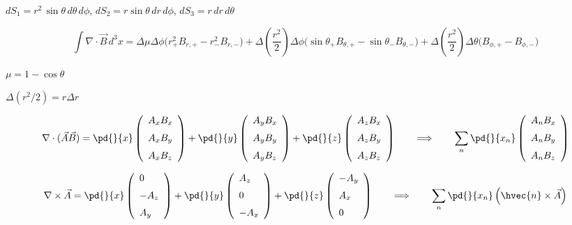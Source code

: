 \documentclass{article}
\begin{document}
$ dS_1 = r^2\,\sin\theta\,d\theta\,d\phi,
\, dS_2 = r\sin\theta\, dr\,d\phi,\, dS_3 = r\,dr\,d\theta$
\pagebreak

\[     \int \nabla\cdot\vec{B}\, d^3x
   =  \Delta \mu\Delta\phi
        \Big(r^2_+B_{r,+} - r^2_-B_{r,-}\Big)
    + \Delta\left(\frac{r^2}{2}\right) \Delta\phi
        \Big(  \sin\theta_+B_{\theta,+} - \sin\theta_-B_{\theta,-}\Big)
    + \Delta\left(\frac{r^2}{2}\right)\Delta\theta
        \Big(B_{\phi,+} - B_{\phi,-}\Big)
\]
\pagebreak

$\mu = 1-\cos\theta$
\pagebreak

$\Delta (r^2/2) = r\Delta r$
\pagebreak

\[     \nabla\cdot(\vec{A}\vec{B}) =
     \pd{}{x}\left(\begin{array}{l}
       A_xB_x \\ \noalign{\medskip}
       A_xB_y \\ \noalign{\medskip}
       A_xB_z
     \end{array}\right)
     +
     \pd{}{y}\left(\begin{array}{l}
       A_yB_x \\ \noalign{\medskip}
       A_yB_y \\ \noalign{\medskip}
       A_yB_z
     \end{array}\right)
     +
     \pd{}{z}\left(\begin{array}{l}
       A_zB_x \\ \noalign{\medskip}
       A_zB_y \\ \noalign{\medskip}
       A_zB_z
     \end{array}\right)
     \qquad\Longrightarrow\qquad
     \sum_n\pd{}{x_n}\left(\begin{array}{l}
       A_nB_x \\ \noalign{\medskip}
       A_nB_y \\ \noalign{\medskip}
       A_nB_z
     \end{array}\right)
\]
\pagebreak

\[     \nabla\times\vec{A} =
     \pd{}{x}\left(\begin{array}{l}
        0  \\ \noalign{\medskip}
       -A_z \\ \noalign{\medskip}
        A_y
     \end{array}\right)
     +
     \pd{}{y}\left(\begin{array}{l}
       A_z \\ \noalign{\medskip}
       0   \\ \noalign{\medskip}
       -A_x
     \end{array}\right)
     +
     \pd{}{z}\left(\begin{array}{l}
       -A_y\\ \noalign{\medskip}
        A_x \\ \noalign{\medskip}
        0
     \end{array}\right)
     \qquad\Longrightarrow\qquad
     \sum_n\pd{}{x_n} \left(\hvec{n}\times\vec{A}\right)
\]
\pagebreak
\end{document}
